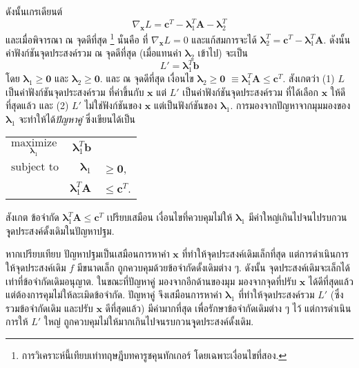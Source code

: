 \begin{Exercise}
ดังนั้นเกรเดียนต์ 
\[
\nabla_{\bm{x}} L = \bm{c}^T - \bm{\lambda}_1^T \bm{A} - \bm{\lambda}_2^T
\]
และเมื่อพิจารณา ณ จุดดีที่สุด%
\footnote{%
การวิเคราะห์นี้เทียบเท่าทฤษฎีบทคารูชคุนทักเกอร์ โดยเฉพาะเงื่อนไขที่สอง.
}
%
นั่นคือ ที่ $\nabla_{\bm{x}} L = 0$ และแก้สมการจะได้ $\bm{\lambda}_2^T = \bm{c}^T - \bm{\lambda}_1^T \bm{A}$.
ดังนั้น 
ค่าฟังก์ชันจุดประสงค์รวม ณ จุดดีที่สุด (เมื่อแทนค่า $\bm{\lambda}_2$ เข้าไป) จะเป็น
\[
L' = \bm{\lambda}_1^T \bm{b}
\]
โดย $\bm{\lambda}_1 \geq \bm{0}$ 
และ $\bm{\lambda}_2 \geq \bm{0}$.
และ ณ จุดดีที่สุด เงื่อนไข $\bm{\lambda}_2 \geq \bm{0}$
$\equiv \bm{\lambda}_1^T \bm{A} \leq \bm{c}^T$.
สังเกตว่า
(1) $L$ เป็นค่าฟังก์ชันจุดประสงค์รวม ที่ค่าขึ้นกับ $\bm{x}$
แต่ $L'$  เป็นค่าฟังก์ชันจุดประสงค์รวม ที่ได้เลือก $\bm{x}$ ให้ดีที่สุดแล้ว
และ (2)
$L'$ ไม่ใช่ฟังก์ชันของ $\bm{x}$ แต่เป็นฟังก์ชันของ $\bm{\lambda}_1$.
การมองจากปัญหาจากมุมมองของ $\bm{\lambda}_1$
จะทำให้ได้\textit{ปัญหาคู่} ซึ่งเขียนได้เป็น
%
\begin{center}
\begin{tabular}{lrl}
$\underset{\bm{\lambda}_1}{\mathrm{maximize}}$ & $\bm{\lambda}_1^T \bm{b}$ & 
\\
$\mbox{subject to}$ & $\bm{\lambda}_1$        & $\geq \bm{0}$,
\\
& $\bm{\lambda}_1^T \bm{A}$        & $\leq \bm{c}^T$.	
\end{tabular}
\end{center}


สังเกต 
ข้อจำกัด $\bm{\lambda}_1^T \bm{A} \leq \bm{c}^T$
เปรียบเสมือน เงื่อนไขที่ควบคุมไม่ให้ $\bm{\lambda}_1$ มีค่าใหญ่เกินไปจนไปรบกวนจุุดประสงค์ดั้งเดิมในปัญหาปฐม.

หากเปรียบเทียบ 
ปัญหาปฐมเป็นเสมือนการหาค่า $\bm{x}$ ที่ทำให้จุดประสงค์เดิมเล็กที่สุด 
แต่การดำเนินการให้จุดประสงค์เดิม $f$ มีขนาดเล็ก ถูกควบคุมด้วยข้อจำกัดดั้งเดิมต่าง ๆ.
ดังนั้น จุดประสงค์เดิมจะเล็กได้เท่าที่ข้อจำกัดเดิมอนุญาต.
ในขณะที่ปัญหาคู่ มองจากอีกด้านของมุม
มองจากจุดที่ปรับ $\bm{x}$ ได้ดีที่สุดแล้ว แต่ต้องการคุมไม่ให้ละเมิดข้อจำกัด.
ปัญหาคู่ จึงเสมือนการหาค่า $\bm{\lambda}_1$ ที่ทำให้จุดประสงค์รวม $L'$ (ซึ่งรวมข้อจำกัดเดิม และปรับ $\bm{x}$ ดีที่สุดแล้ว) 
มีค่ามากที่สุด เพื่อรักษาข้อจำกัดเดิมต่าง ๆ ไว้
แต่การดำเนินการให้ $L'$ ใหญ่ ถูกควบคุมไม่ให้มากเกินไปจนรบกวนจุุดประสงค์ดั้งเดิม.


\end{Exercise}
